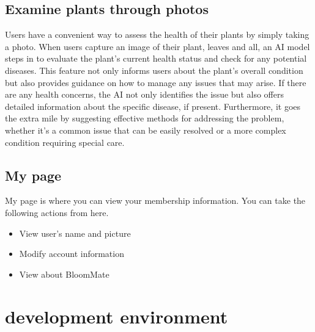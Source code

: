 \documentclass[conference, a4paper]{IEEEtran}
\begin{document}
\subsection{Examine plants through photos}
Users have a convenient way to assess the health of their plants by simply taking a photo. When users capture an image of their plant, leaves and all, an AI model steps in to evaluate the plant's current health status and check for any potential diseases. This feature not only informs users about the plant's overall condition but also provides guidance on how to manage any issues that may arise. If there are any health concerns, the AI not only identifies the issue but also offers detailed information about the specific disease, if present. Furthermore, it goes the extra mile by suggesting effective methods for addressing the problem, whether it's a common issue that can be easily resolved or a more complex condition requiring special care. \\ 

\subsection{My page}
My page is where you can view your membership information. You can take the following actions from here.
\begin{itemize}
    \item View user's name and picture
    \item Modify account information
    \item View about BloomMate
\end{itemize}


\section{development environment}
\end{document}
